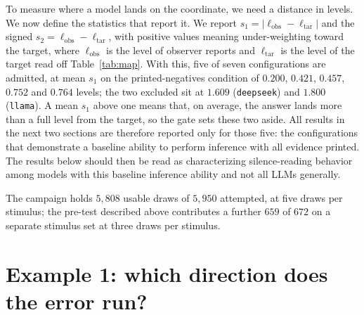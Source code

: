 \documentclass{article}
\theoremstyle{plain}
\theoremstyle{definition}
\theoremstyle{remark}
\newcommand{\lobs}{\ell_{\mathrm{obs}}}
\newcommand{\ltar}{\ell_{\mathrm{tar}}}        %
\newcommand{\lcor}{\ltar}                       %
\newif\ifanchorlead
\begin{document}
To measure where a model lands on the coordinate, we need a distance in
levels. We now define the statistics that report it.
We report $s_1 = |\lobs - \lcor|$ and the signed $s_2 = \lobs - \lcor$, with
positive values meaning under-weighting toward the target, where $\lobs$ is the
level of observer reports and $\lcor$ is the level of the target read off
Table~\ref{tab:map}. With this, five of seven configurations are admitted, at mean $s_1$
on the printed-negatives condition of $0.200$, $0.421$,
$0.457$, $0.752$ and $0.764$ levels; the two excluded sit at $1.609$
(\texttt{deepseek}) and $1.800$ (\texttt{llama}). A mean $s_1$ above one means that, on average, the
answer lands more than a full level from the target, so the gate sets these two aside. 
All results in the next two sections are therefore reported only for those five: 
the configurations that demonstrate a baseline ability to perform inference 
with all evidence printed. The results below should 
then be read as characterizing silence-reading behavior among models with 
this baseline inference ability and not all LLMs generally.

The campaign
holds $5{,}808$ usable draws of $5{,}950$ attempted, at five draws per stimulus;
the pre-test described above contributes a further $659$ of $672$ on a separate
stimulus set at three draws per stimulus.



\section{Example 1: which direction does the error run?}\label{sec:ex1}
\end{document}
